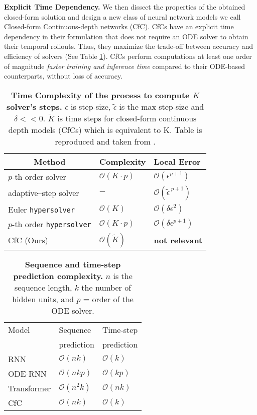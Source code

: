 \documentclass[12pt]{article}
\begin{document}
\noindent\textbf{Explicit Time Dependency.} We then dissect the properties of the obtained closed-form solution and design a new class of neural network models we call Closed-form Continuous-depth networks (CfC). CfCs have an explicit time dependency in their formulation that does not require an ODE solver to obtain their temporal rollouts. Thus, they maximize the trade-off between accuracy and efficiency of solvers (See Table \ref{tab:1}). CfCs perform computations at least one order of magnitude \textit{faster training and inference time} compared to their ODE-based counterparts, without loss of accuracy.

\begin{table}[t]
	\caption{\textbf{Time Complexity of the process to compute $K$ solver's steps.} $\epsilon$ is step-size, $\tilde \epsilon$ is the max step-size and $\delta << 0$. $\tilde K$ is time steps for closed-form continuous depth models (CfCs) which is equivalent to K. Table is reproduced and taken from \cite{poli2020hypersolvers}.}
	\setlength{\tabcolsep}{4pt}
	\centering
\begin{tabular}{lll}
		\toprule
		\multicolumn{1}{c}{Method} & \multicolumn{1}{c}{Complexity} & Local Error \\
		\midrule
		$p$-th order solver & $\mathcal{O}(K\cdot p)$ & $\mathcal{O}(\epsilon^{p+1})$ \\
		adaptive--step solver & $-$  & $\mathcal{O}(\tilde \epsilon^{~p+1})$\\
		Euler {\tt hypersolver}& $ \mathcal{O}(K)$ & $\mathcal{O}(\delta \epsilon^{2})$ \\
		$p$-th order {\tt hypersolver} & $ \mathcal{O}(K\cdot p)$ & $\mathcal{O}(\delta \epsilon^{p+1})$ \\
		CfC (Ours) & $\mathcal{O}(\tilde K)$ & \textbf{not relevant} \\
		\bottomrule
	\end{tabular}
	\label{tab:1}
\end{table}

\begin{table}[t]
\centering
\caption{\textbf{Sequence and time-step prediction complexity.} $n$ is the sequence length, $k$ the number of hidden units, and $p$ = order of the ODE-solver.}
    \begin{tabular}{lll}\toprule
         Model & Sequence & Time-step  \\
          & prediction & prediction \\
         \midrule
         RNN & $\mathcal{O}(nk)$ &  $\mathcal{O}(k)$\\
         ODE-RNN & $\mathcal{O}(nkp)$ & $\mathcal{O}(kp)$\\
         Transformer & $\mathcal{O}(n^2 k)$ & $\mathcal{O}(nk)$\\
         CfC & $\mathcal{O}(nk)$ & $\mathcal{O}(k)$\\
         \bottomrule
    \end{tabular}
    \label{tab:transformers}
\end{table}
\end{document}
